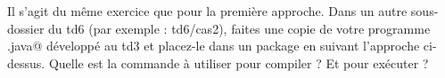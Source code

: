 \documentclass[a4paper,11pt]{article}
\begin{document}
		\begin{Exercice}{}
				Il s'agit du m\^eme exercice que pour la premi\`ere approche.
				Dans un autre sous-dossier du td6 (par exemple : td6/cas2),
				faites une copie de votre programme \verb@Hello.java@ d\'evelopp\'e au td3
				et placez-le dans un package en suivant l'approche ci-dessus.
				Quelle est la commande \`a utiliser pour compiler ?
				Et pour ex\'ecuter ?
		\end{Exercice}
			
            \par
        
		\par\medskip 
				
				
\end{document}
